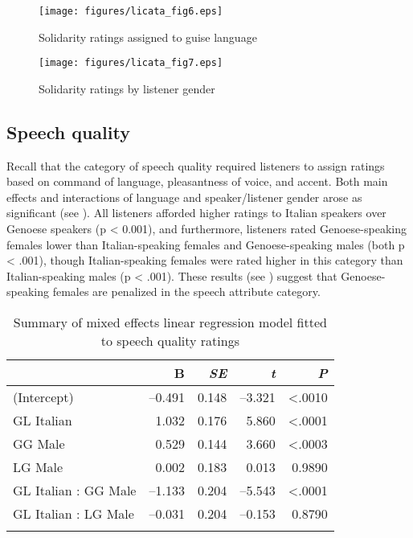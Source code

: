 \documentclass[output=paper,colorlinks,citecolor=brown]{langscibook}
\begin{document}
\begin{figure}
    \texttt{[image: figures/licata\_fig6.eps]}
    \caption{Solidarity ratings assigned to guise language}
    \label{fig:licata:06}
\end{figure}

\begin{figure}
    \texttt{[image: figures/licata\_fig7.eps]}
    \caption{Solidarity ratings by listener gender}
    \label{fig:licata:07}
\end{figure}

\subsection{Speech quality}
Recall that the category of speech quality required listeners to assign ratings based on command of language, pleasantness of voice, and accent. Both main effects and interactions of language and speaker/listener gender arose as significant (see ). All listeners afforded higher ratings to Italian speakers over Genoese speakers (p < 0.001), and furthermore, listeners rated Genoese-speaking females lower than Italian-speaking females and Genoese-speaking males (both p < .001), though Italian-speaking females were rated higher in this category than Italian-speaking males (p < .001). These results (see ) suggest that Genoese-speaking females are penalized in the speech attribute category.

\begin{table}
\begin{tabular}{lrrrr}
\lsptoprule
                     & Β      & \textit{SE} & \textit{t} & \textit{P} \\
\midrule
(Intercept)          & –0.491 & 0.148       & –3.321     & <.0010     \\
GL Italian           & 1.032  & 0.176       & 5.860      & <.0001     \\
GG Male              & 0.529  & 0.144       & 3.660      & <.0003     \\
LG Male              & 0.002  & 0.183       & 0.013      & 0.9890     \\
GL Italian : GG Male & –1.133 & 0.204       & –5.543     & <.0001     \\
GL Italian : LG Male & –0.031 & 0.204       & –0.153     & 0.8790     \\
\lspbottomrule
\end{tabular}
\caption{Summary of mixed effects linear regression model fitted to speech quality ratings}
\label{tab:licata:04}
\end{table}
\end{document}
